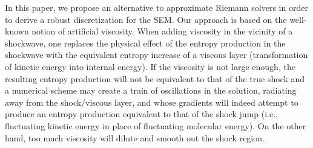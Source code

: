 \documentclass[preprint,10pt]{elsarticle}
\begin{document}
In this paper, we propose an alternative to approximate Riemann solvers in order to derive a robust discretization for the SEM. Our approach is 
based on the well-known notion of artificial viscosity.  
When adding viscosity in the vicinity of a shockwave, one replaces the physical effect of the entropy production in the shockwave with the equivalent entropy increase of a viscous layer (transformation of kinetic energy into internal energy).  
If the viscosity is not large enough, the resulting entropy production will not be equivalent to that of the true shock and a numerical scheme 
may create a train of oscillations in the solution, radiating away from the shock/viscous layer, and whose gradients will indeed attempt to produce 
an entropy production equivalent to that of the shock jump (i.e., fluctuating kinetic energy in place of fluctuating molecular energy). 
On the other hand, too much viscosity will dilute and smooth out the shock region. 
%
%
\end{document}
